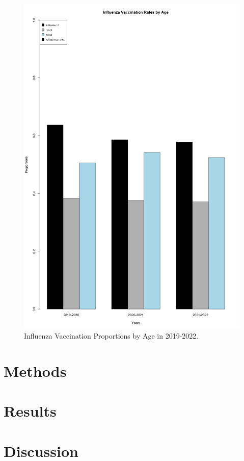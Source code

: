 \documentclass[12pt]{article}
\begin{document}
\begin{figure}[ht!]
  \centering
  \includegraphics[width= 125mm ,scale=.5]{age.png}
  \caption{Influenza Vaccination Proportions by Age in 2019-2022.}
  \label{fig:age}
\end{figure}

\clearpage
\section{Methods}
\label{sec:Methods}

\section{Results}
\label{sec:Results}

\section{Discussion}
\label{sec:Discussion}

\clearpage


\end{document}
